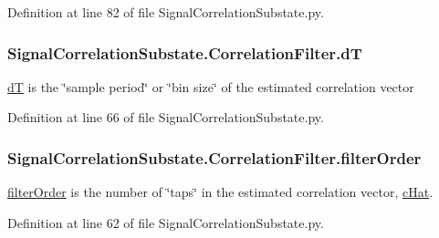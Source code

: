 Definition at line 82 of file Signal\+Correlation\+Substate.\+py.

\subsubsection[{\texorpdfstring{dT}{dT}}]{\setlength{\rightskip}{0pt plus 5cm}Signal\+Correlation\+Substate.\+Correlation\+Filter.\+dT}\hypertarget{classSignalCorrelationSubstate_1_1CorrelationFilter_a500e4823c314d54a21f236b6b896c8eb}{}\label{classSignalCorrelationSubstate_1_1CorrelationFilter_a500e4823c314d54a21f236b6b896c8eb}


\hyperlink{classSignalCorrelationSubstate_1_1CorrelationFilter_a500e4823c314d54a21f236b6b896c8eb}{dT} is the \char`\"{}sample period\char`\"{} or \char`\"{}bin size\char`\"{} of the estimated correlation vector 



Definition at line 66 of file Signal\+Correlation\+Substate.\+py.

\subsubsection[{\texorpdfstring{filter\+Order}{filterOrder}}]{\setlength{\rightskip}{0pt plus 5cm}Signal\+Correlation\+Substate.\+Correlation\+Filter.\+filter\+Order}\hypertarget{classSignalCorrelationSubstate_1_1CorrelationFilter_a4b49b7bd52c1346cca0342942a5bbbb6}{}\label{classSignalCorrelationSubstate_1_1CorrelationFilter_a4b49b7bd52c1346cca0342942a5bbbb6}


\hyperlink{classSignalCorrelationSubstate_1_1CorrelationFilter_a4b49b7bd52c1346cca0342942a5bbbb6}{filter\+Order} is the number of \char`\"{}taps\char`\"{} in the estimated correlation vector, \hyperlink{classSignalCorrelationSubstate_1_1CorrelationFilter_ad07b1d484b9ab77a1a8fc215f10faf15}{c\+Hat}. 



Definition at line 62 of file Signal\+Correlation\+Substate.\+py.

